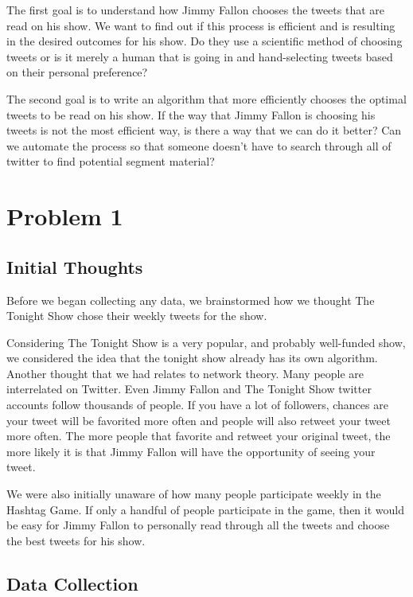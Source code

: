 \documentclass[titlepage]{article}
\begin{document}
The first goal is to understand how Jimmy Fallon chooses the tweets that are read on his show. We want to find out if this process is efficient and is resulting in the desired outcomes for his show. Do they use a scientific method of choosing tweets or is it merely a human that is going in and hand-selecting tweets based on their personal preference?

The second goal is to write an algorithm that more efficiently chooses the optimal tweets to be read on his show. If the way that Jimmy Fallon is choosing his tweets is not the most efficient way, is there a way that we can do it better? Can we automate the process so that someone doesn't have to search through all of twitter to find potential segment material?

\section{Problem 1}

\subsection{Initial Thoughts}

Before we began collecting any data, we brainstormed how we thought The Tonight Show chose their weekly tweets for the show. 

Considering The Tonight Show is a very popular, and probably well-funded show, we considered the idea that the tonight show already has its own algorithm. Another thought that we had relates to network theory. Many people are interrelated on Twitter. Even Jimmy Fallon and The Tonight Show twitter accounts follow thousands of people. If you have a lot of followers, chances are your tweet will be favorited more often and people will also retweet your tweet more often. The more people that favorite and retweet your original tweet, the more likely it is that Jimmy Fallon will have the opportunity of seeing your tweet. 

We were also initially unaware of how many people participate weekly in the Hashtag Game. If only a handful of people participate in the game, then it would be easy for Jimmy Fallon to personally read through all the tweets and choose the best tweets for his show. 


\subsection{Data Collection}
\end{document}
